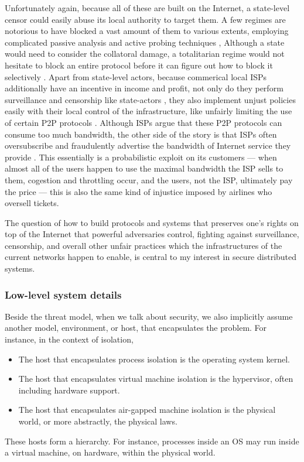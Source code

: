 \documentclass[10pt]{article}
\begin{document}
Unfortunately again, because all of these are built on the Internet, a
state-level censor could easily abuse its local authority to target them. A few
regimes are notorious to have blocked a vast amount of them to various
extents, employing complicated passive analysis and active probing techniques
\cite{censor.block.1, censor.block.2,censor.block.3, censor.block.4,
censor.block.5,censor.block.6},
Although a state would need to consider the collatoral damage, a totalitarian
regime would not hesitate to block an entire protocol before it can figure out
how to block it selectively \cite{selective.block.1, censor.block.4}. 
Apart from state-level actors, because commerical local ISPs additionally
have an incentive in income and profit, not only do they perform surveillance
and censorship like state-actors \cite{isp.statelike.actions.1,
isp.statelike.actions.2}, they also implement unjust policies easily with their
local control of the infrastructure, like unfairly limiting the use of certain
P2P protocols \cite{isp.block.p2p.1, isp.block.p2p.2, isp.block.p2p.3,
isp.statelike.actions.1}.  Although ISPs argue that these P2P protocols can
consume too much bandwidth, the other side of the story is that ISPs often
oversubscribe and fraudulently advertise the bandwidth of Internet service they
provide \cite{isp.oversubscribe.1, isp.oversubscribe.2}. This essentially is a
probabilistic exploit on its customers --- when almost all of the users happen
to use the maximal bandwidth the ISP sells to them, cogestion and throttling
occur, and the users, not the ISP, ultimately pay the price --- this is also
the same kind of injustice imposed by airlines who oversell tickets.

The question of how to build protocols and systems that preserves one's rights
on top of the Internet that powerful adversaries control, fighting against
surveillance, censorship, and overall other unfair practices which the
infrastructures of the current networks happen to enable, is central to my
interest in secure distributed systems.

\subsubsection{Low-level system details}
Beside the threat model, when we talk about security, we also implicitly assume
another model, environment, or host, that encapsulates the problem. For
instance, in the context of isolation, 
\begin{itemize}
	\item The host that encapsulates process isolation is the operating system
		kernel.
	\item The host that encapsulates virtual machine isolation is the
		hypervisor, often including hardware support.
	\item The host that encapsulates air-gapped machine isolation is the
		physical world, or more abstractly, the physical laws.
\end{itemize} 
These hosts form a hierarchy. For instance, processes inside an OS may run
inside a virtual machine, on hardware, within the physical world.
\end{document}
